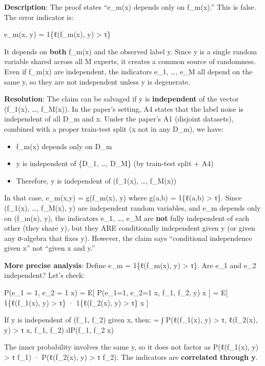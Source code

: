 \documentclass[
  12pt,
]{ctexart}
\providecommand{\tightlist}{%
  \setlength{\itemsep}{0pt}\setlength{\parskip}{0pt}}
\begin{document}
\textbf{Description}: The proof states ``e\_m(x) depends only on
f\_m(x).'' This is false. The error indicator is:

e\_m(x, y) = 1\{ℓ(f\_m(x), y) \textgreater{} τ\}

It depends on \textbf{both} f\_m(x) and the observed label y. Since y is
a single random variable shared across all M experts, it creates a
common source of randomness. Even if f\_m(x) are independent, the
indicators e\_1, \ldots, e\_M all depend on the same y, so they are not
independent unless y is degenerate.

\textbf{Resolution}: The claim can be salvaged if y is
\textbf{independent} of the vector (f\_1(x), \ldots, f\_M(x)). In the
paper's setting, A4 states that the label noise is independent of all
D\_m and x. Under the paper's A1 (disjoint datasets), combined with a
proper train-test split (x not in any D\_m), we have:

\begin{itemize}
\tightlist
\item
  f\_m(x) depends only on D\_m
\item
  y is independent of \{D\_1, \ldots, D\_M\} (by train-test split + A4)
\item
  Therefore, y is independent of (f\_1(x), \ldots, f\_M(x))
\end{itemize}

In that case, e\_m(x,y) = g(f\_m(x), y) where g(a,b) = 1\{ℓ(a,b)
\textgreater{} τ\}. Since (f\_1(x), \ldots, f\_M(x), y) are independent
random variables, and e\_m depends only on (f\_m(x), y), the indicators
e\_1, \ldots, e\_M are \textbf{not} fully independent of each other
(they share y), but they ARE conditionally independent given y (or given
any σ-algebra that fixes y). However, the claim says ``conditional
independence given x'' not ``given x and y.''

\textbf{More precise analysis}: Define e\_m = 1\{ℓ(f\_m(x), y)
\textgreater{} τ\}. Are e\_1 and e\_2 independent? Let's check:

P(e\_1 = 1, e\_2 = 1 \textbar{} x) = E{[} P(e\_1=1, e\_2=1 \textbar{} x,
f\_1, f\_2, y) \textbar{} x {]} = E{[} 1\{ℓ(f\_1(x), y) \textgreater{}
τ\} · 1\{ℓ(f\_2(x), y) \textgreater{} τ\} \textbar{} x {]}

If y is independent of (f\_1, f\_2) given x, then: = ∫ P(ℓ(f\_1(x), y)
\textgreater{} τ, ℓ(f\_2(x), y) \textgreater{} τ \textbar{} x, f\_1,
f\_2) dP(f\_1, f\_2 \textbar{} x)

The inner probability involves the same y, so it does not factor as
P(ℓ(f\_1(x), y) \textgreater{} τ \textbar{} f\_1) · P(ℓ(f\_2(x), y)
\textgreater{} τ \textbar{} f\_2). The indicators are \textbf{correlated
through y}.
\end{document}
